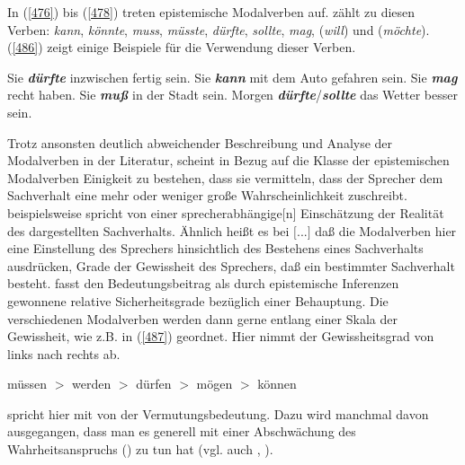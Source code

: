 In (\ref{476}) bis (\ref{478}) treten epistemische Modalverben  auf. \citet[26]{Mache2009} zählt zu diesen Verben: \textit{kann}, \textit{könnte}, \textit{muss}, \textit{müsste}, \textit{dürfte}, \textit{sollte}, \textit{mag}, (\textit{will}) und (\textit{möchte}). (\ref{486}) zeigt einige Beispiele für die Verwendung dieser Verben.
	
\begin{exe}
	\ex\label{486} 
		\begin{xlist}	
			\ex\label{486a} Sie \textit{\textbf{dürfte}} inzwischen fertig sein.
			\ex\label{486b} Sie \textbf{\textit{kann}} mit dem Auto gefahren sein.
			\ex\label{486c} Sie \textit{\textbf{mag}} recht haben.
			\ex\label{486d} Sie \textit{\textbf{muß}} in der Stadt sein.	
			\hfill\hbox {\citet[220]{Diewald1999b}}
			\ex\label{486e} Morgen \textit{\textbf{dürfte}}/\textit{\textbf{sollte}} das Wetter besser sein.			
		\end{xlist}
\end{exe}	
Trotz ansonsten deutlich abweichender Beschreibung und Analyse der Modalverben in der Literatur, scheint in Bezug auf die Klasse der epistemischen Modalverben  Einigkeit zu bestehen, dass sie vermitteln, dass der Sprecher dem Sachverhalt eine mehr oder weniger große Wahrscheinlichkeit zuschreibt. \citet[25]{Diewald1997} beispielsweise spricht von einer \glqq sprecherabhängige$[$n$]$ Einschätzung der Rea\-lität des dargestellten Sachverhalts\grqq{}. Ähnlich heißt es bei \citet[28]{Oehlschlaeger1989} \glqq $[$...$]$ daß die Modalverben hier eine Einstellung des Sprechers hinsichtlich des Bestehens eines Sachverhalts ausdrücken, Grade der Gewissheit des Sprechers, daß ein bestimmter Sachverhalt besteht\grqq{}. \citet[350]{Loetscher1991} fasst den Bedeutungsbeitrag als \glqq durch epistemische Inferenzen gewonnene relative Sicherheitsgrade bezüglich einer Behauptung\grqq{}. Die verschiedenen Modalverben werden dann gerne entlang einer Skala der Gewissheit, wie z.B. in (\ref{487}) geordnet. Hier nimmt der Gewissheitsgrad von links nach rechts ab. 

\begin{exe}
	\ex\label{487} 
	müssen $>$ werden $>$ dürfen $>$ mögen $>$ können
	\hfill\hbox {\citet[206]{Oehlschlaeger1989}}
\end{exe}
\citet[108]{Liedke2000} spricht hier mit \citet[21]{Buscha1981[1971]} von der \glqq Vermutungsbedeutung\grqq{}. Dazu wird manchmal davon ausgegangen, dass man es generell mit einer \glqq Abschwächung des Wahrheitsanspruchs\grqq{} (\citealt[109]{Liedke2000}) zu tun hat (vgl. auch \citealt[222]{Diewald1993}, \citealt[205]{Diewald1999b}).

